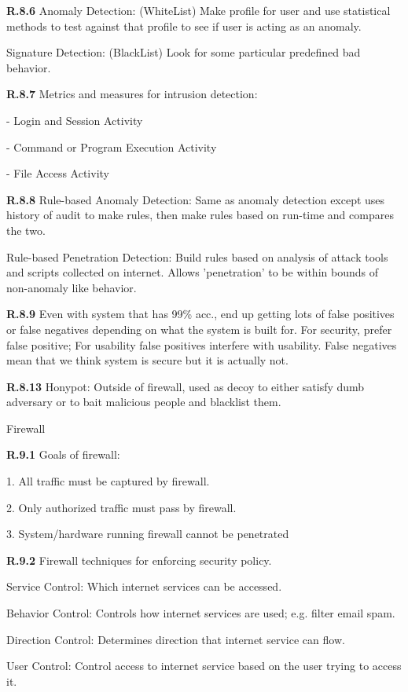 \documentclass[8pt]{extreport}
\begin{document}
{\bf R.8.6}
Anomaly Detection: (WhiteList) Make profile for user and use statistical methods to test
against that profile to see if user is acting as an anomaly.

Signature Detection: (BlackList) Look for some particular predefined bad
behavior.

{\bf R.8.7}
Metrics and measures for intrusion detection:

- Login and Session Activity

- Command or Program Execution Activity

- File Access Activity

{\bf R.8.8}
Rule-based Anomaly Detection: Same as anomaly detection except uses history of
audit to make rules, then make rules based on run-time and compares the two.

Rule-based Penetration Detection: Build rules based on analysis of attack tools
and scripts collected on internet. Allows 'penetration' to be within bounds of
non-anomaly like behavior.

{\bf R.8.9}
Even with system that has 99\% acc., end up getting lots of false positives or
false negatives depending on what the system is built for. For security, prefer
false positive; For usability false positives interfere with usability. False
negatives mean that we think system is secure but it is actually not.

{\bf R.8.13}
Honypot: Outside of firewall, used as decoy to either satisfy dumb adversary or
to bait malicious people and blacklist them.



{\Huge Firewall}

{\bf R.9.1}
Goals of firewall:

1. All traffic must be captured by firewall.

2. Only authorized traffic must pass by firewall.

3. System/hardware running firewall cannot be penetrated

{\bf R.9.2}
Firewall techniques for enforcing security policy.

Service Control: Which internet services can be accessed.

Behavior Control: Controls how internet services are used; e.g. filter email spam.

Direction Control: Determines direction that internet service can flow.

User Control: Control access to internet service based on the user trying to
access it.
\end{document}
